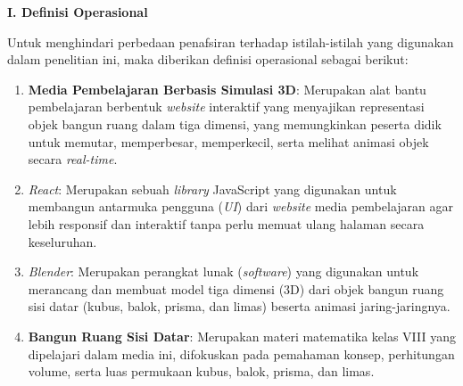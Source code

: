 \vspace{0.5cm}

\textbf{I. Definisi Operasional}

\hspace*{1cm}Untuk menghindari perbedaan penafsiran terhadap istilah-istilah yang digunakan dalam penelitian ini, maka diberikan definisi operasional sebagai berikut:
\begin{enumerate}
    \item \textbf{Media Pembelajaran Berbasis Simulasi 3D}: Merupakan alat bantu pembelajaran berbentuk \textit{website} interaktif yang menyajikan representasi objek bangun ruang dalam tiga dimensi, yang memungkinkan peserta didik untuk memutar, memperbesar, memperkecil, serta melihat animasi objek secara \textit{real-time}.
    \item \textit{React}: Merupakan sebuah \textit{library} JavaScript yang digunakan untuk membangun antarmuka pengguna (\textit{UI}) dari \textit{website} media pembelajaran agar lebih responsif dan interaktif tanpa perlu memuat ulang halaman secara keseluruhan.
    \item \textit{Blender}: Merupakan perangkat lunak (\textit{software}) yang digunakan untuk merancang dan membuat model tiga dimensi (3D) dari objek bangun ruang sisi datar (kubus, balok, prisma, dan limas) beserta animasi jaring-jaringnya.
    \item \textbf{Bangun Ruang Sisi Datar}: Merupakan materi matematika kelas VIII yang dipelajari dalam media ini, difokuskan pada pemahaman konsep, perhitungan volume, serta luas permukaan kubus, balok, prisma, dan limas.
\end{enumerate}